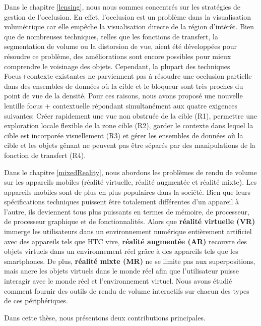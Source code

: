 Dans le chapitre \ref{lensing}, nous nous sommes concentrés sur les stratégies de gestion de l'occlusion. En effet, l'occlusion est un problème dans la visualisation volumétrique car elle empêche la visualisation directe de la région d'intérêt. Bien que de nombreuses techniques, telles que les fonctions de transfert, la segmentation de volume ou la distorsion de vue, aient été développées pour résoudre ce problème, des améliorations sont encore possibles pour mieux comprendre le voisinage des objets. Cependant, la plupart des techniques Focus+contexte existantes ne parviennent pas à résoudre une occlusion partielle dans des ensembles de données où la cible et le bloqueur sont très proches du point de vue de la densité. Pour ces raisons, nous avons proposé une nouvelle lentille focus + contextuelle répondant simultanément aux quatre exigences suivantes: Créer rapidement une vue non obstruée de la cible (R1), permettre une exploration locale flexible de la zone cible (R2), garder le contexte dans lequel la cible est incorporée visuellement (R3) et gérer les ensembles de données où la cible et les objets gênant ne peuvent pas être séparés par des manipulations de la fonction de transfert (R4).



Dans le chapitre \ref{mixedReality}, nous abordons les problèmes de rendu de volume sur les appareils mobiles (réalité virtuelle, réalité augmentée et réalité mixte). Les appareils mobiles sont de plus en plus populaires dans la société. Bien que leurs spécifications techniques puissent être totalement différentes d’un appareil à l’autre, ils deviennent tous plus puissants en termes de mémoire, de processeur, de processeur graphique et de fonctionnalités. Alors que \textbf{réalité virtuelle (VR)} immerge les utilisateurs dans un environnement numérique entièrement artificiel avec des appareils tels que HTC vive, \textbf{réalité augmentée (AR)} recouvre des objets virtuels dans un environnement réel grâce à des appareils tels que les smartphones. De plus, \textbf {réalité mixte (MR)} ne se limite pas aux superpositions, mais ancre les objets virtuels dans le monde réel afin que l'utilisateur puisse interagir avec le monde réel et l'environnement virtuel. Nous avons étudié comment fournir des outils de rendu de volume interactifs sur chacun des types de ces périphériques.


Dans cette thèse, nous présentons deux contributions principales.

